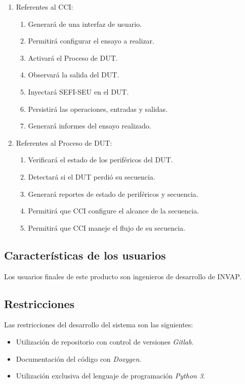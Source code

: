 \documentclass[
11pt, %
codirector, %
]{charter}
\begin{document}
\begin{enumerate}
	\item Referentes al CCI:
		\begin{enumerate}
			\item Generará de una interfaz de usuario.
			\item Permitirá configurar el ensayo a realizar.
			\item Activará el Proceso de DUT.
			\item Observará la salida del DUT.
			\item Inyectará SEFI-SEU en el DUT.
			\item Persistirá las operaciones, entradas y salidas.
			\item Generará informes del ensayo realizado.
		\end{enumerate}
	\item Referentes al Proceso de DUT:
		\begin{enumerate}
			\item Verificará el estado de los periféricos del DUT.
			\item Detectará si el DUT perdió su secuencia.
			\item Generará reportes de estado de periféricos y secuencia.
			\item Permitirá que CCI configure el alcance de la secuencia.
			\item Permitirá que CCI maneje el flujo de su secuencia.
		\end{enumerate}
\end{enumerate}

\subsection{Características de los usuarios}
\label{sub:usuarios}

Los usuarios finales de este producto son ingenieros de desarrollo de INVAP.

\subsection{Restricciones}
\label{sub:restricciones}

Las restricciones del desarrollo del sistema son las siguientes:

\begin{itemize}
	\item Utilización de repositorio con control de versiones \emph{Gitlab}.
	\item Documentación del código con \emph{Doxygen}.
	\item Utilización exclusiva del lenguaje de programación \emph{Python 3}.
\end{itemize}
\end{document}
